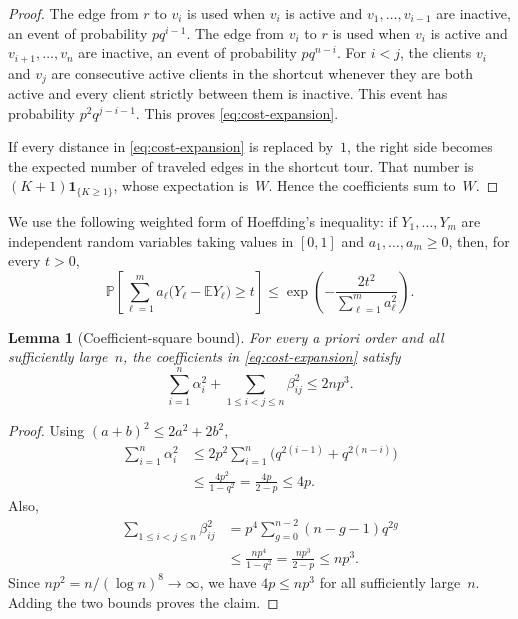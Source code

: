 \documentclass[11pt]{article}
\newtheorem{lemma}[theorem]{Lemma}
\theoremstyle{remark}
\newcommand{\E}{\mathbb{E}}
\newcommand{\Prob}{\mathbb{P}}
\newcommand{\one}{\mathbf{1}}
\begin{document}
\begin{proof}
The edge from $r$ to $v_i$ is used when $v_i$ is active and
$v_1,\ldots,v_{i-1}$ are inactive, an event of probability $pq^{i-1}$.
The edge from $v_i$ to $r$ is used when $v_i$ is active and
$v_{i+1},\ldots,v_n$ are inactive, an event of probability $pq^{n-i}$.
For $i<j$, the clients $v_i$ and $v_j$ are consecutive active clients in the
shortcut whenever they are both active and every client strictly between them
is inactive.  This event has probability $p^2q^{j-i-1}$.  This proves
\eqref{eq:cost-expansion}.

If every distance in \eqref{eq:cost-expansion} is replaced by~$1$, the right
side becomes the expected number of traveled edges in the shortcut tour.  That
number is $(K+1)\one_{\{K\geq1\}}$, whose expectation is~$W$.  Hence the
coefficients sum to~$W$.
\end{proof}

We use the following weighted form of Hoeffding's inequality: if
$Y_1,\ldots,Y_m$ are independent random variables taking values in $[0,1]$ and
$a_1,\ldots,a_m\geq0$, then, for every $t>0$,
\begin{equation}\label{eq:weighted-hoeffding}
    \Prob\!\left[
        \sum_{\ell=1}^m a_\ell
        \bigl(Y_\ell-\E Y_\ell\bigr)\geq t
    \right]
    \leq
    \exp\!\left(-\frac{2t^2}{\sum_{\ell=1}^m a_\ell^2}\right).
\end{equation}

\begin{lemma}[Coefficient-square bound]\label{lem:squares}
For every a priori order and all sufficiently large~$n$, the coefficients in
\eqref{eq:cost-expansion} satisfy
\[
    \sum_{i=1}^n\alpha_i^2
    +
    \sum_{1\leq i<j\leq n}\beta_{ij}^2
    \leq 2np^3.
\]
\end{lemma}

\begin{proof}
Using $(a+b)^2\leq2a^2+2b^2$,
\begin{align*}
    \sum_{i=1}^n\alpha_i^2
    &\leq
    2p^2\sum_{i=1}^n
        \bigl(q^{2(i-1)}+q^{2(n-i)}\bigr)\\
    &\leq
    \frac{4p^2}{1-q^2}
    =\frac{4p}{2-p}
    \leq 4p.
\end{align*}
Also,
\begin{align*}
    \sum_{1\leq i<j\leq n}\beta_{ij}^2
    &=p^4\sum_{g=0}^{n-2}(n-g-1)q^{2g}\\
    &\leq
    \frac{np^4}{1-q^2}
    =\frac{np^3}{2-p}
    \leq np^3.
\end{align*}
Since $np^2=n/(\log n)^8\to\infty$, we have $4p\leq np^3$ for all
sufficiently large~$n$.  Adding the two bounds proves the claim.
\end{proof}
\end{document}
